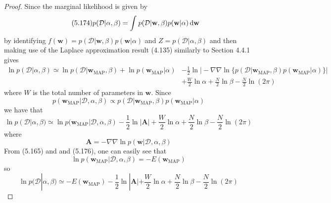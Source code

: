 \vspace{1em}

\begin{proof}
    Since the marginal likelihood is given by
    \begin{equation}\label{eq:5.174}\tag{5.174}
        p(\mathcal{D} | \alpha, \beta)
        = \int_{}^{} p(\mathcal{D} | \mathbf{w}, \beta) p(\mathbf{w} | \alpha) \mathop{}\!\mathrm{d} \mathbf{w}
    \end{equation}
    by identifying $f(\mathbf{w}) = p(\mathcal{D} | \mathbf{w}, \beta)p(\mathbf{w} | \alpha)$
    and $Z = p(\mathcal{D} | \alpha, \beta)$ and then making use of the Laplace approximation
    result (4.135) similarly to Section 4.4.1 gives
    \begin{align*}
        \ln p(\mathcal{D} | \alpha, \beta)
        \simeq \ln p(\mathcal{D} | \mathbf{w}_\text{MAP}, \beta) 
        + \ln p(\mathbf{w}_\text{MAP} | \alpha)
        &- \frac{1}{2} \ln\bigg|-\nabla \nabla \ln 
        \big\{p(\mathcal{D} | \mathbf{w}_\text{MAP}, \beta) p(\mathbf{w}_\text{MAP} | \alpha)\big\}
        \bigg|  \\
        &+ \frac{W}{2} \ln \alpha
        + \frac{N}{2} \ln \beta - \frac{N}{2} \ln(2\pi)
    \end{align*}
    where $W$ is the total number of parameters in $\mathbf{w}$. Since 
    \[
        p(\mathbf{w}_\text{MAP} | \mathcal{D}, \alpha, \beta) 
        \propto p(\mathcal{D} | \mathbf{w}_\text{MAP}, \beta)p(\mathbf{w}_\text{MAP} | \alpha)
    \] 
    we have that
    \[
        \ln p(\mathcal{D} | \alpha, \beta)
        \simeq \ln p(\mathbf{w}_\text{MAP} | \mathcal{D}, \alpha, \beta)
        - \frac{1}{2} \ln |\mathbf{A}|
        + \frac{W}{2} \ln \alpha
        + \frac{N}{2} \ln \beta - \frac{N}{2} \ln(2\pi)
    \] 
    where
    \begin{equation}\label{eq:5.166}\tag{5.166}
        \mathbf{A} = -\nabla \nabla \ln p(\mathbf{w} | \mathcal{D}, \alpha, \beta)
    \end{equation}
    From (5.165) and and (5.176), one can easily see that
    \[
        \ln p(\mathbf{w}_\text{MAP} | \mathcal{D}, \alpha, \beta)
        = -E(\mathbf{w}_\text{MAP})
    \]
    so
    \begin{equation}\label{eq:5.175}\tag{5.175}
        \ln p(\mathcal{D} | \alpha, \beta)
        \simeq -E(\mathbf{w}_\text{MAP})
        - \frac{1}{2} \ln |\mathbf{A}|
        + \frac{W}{2} \ln \alpha
        + \frac{N}{2} \ln \beta - \frac{N}{2} \ln(2\pi)
    \end{equation}
\end{proof}
